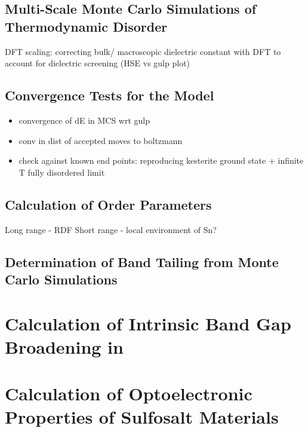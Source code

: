 \subsection{Multi-Scale Monte Carlo Simulations of Thermodynamic Disorder}
DFT scaling: correcting bulk/ macroscopic dielectric constant with DFT to account for dielectric screening (HSE vs gulp plot)
\subsection{Convergence Tests for the Model}
\begin{itemize}
\item convergence of dE in MCS wrt gulp
\item conv in dist of accepted moves to boltzmann
\item check against known end points: reproducing kesterite ground state + infinite T fully disordered limit
\end{itemize}

\subsection{Calculation of Order Parameters}
Long range - RDF
Short range - local environment of Sn?

\subsection{Determination of Band Tailing from Monte Carlo Simulations}


\section{Calculation of Intrinsic Band Gap Broadening in \CZTS}


\section{Calculation of Optoelectronic Properties of Sulfosalt Materials}

                            
